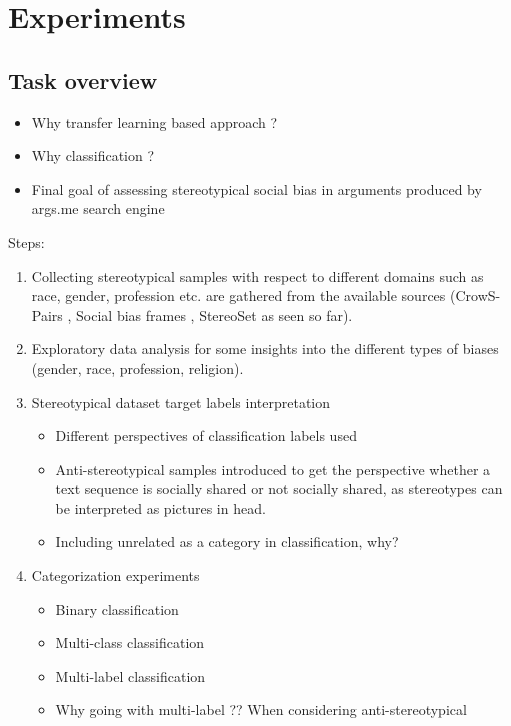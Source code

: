 \chapter{Experiments}

\section{ Task overview}
\begin{itemize}
    \item Why transfer learning based approach ?
    \item Why classification ?
    \item Final goal of assessing stereotypical social bias in arguments produced by args.me search engine
\end{itemize}

Steps: 
\begin{enumerate}
    \item Collecting stereotypical samples with respect to different domains such as race, gender, profession etc. are gathered from the available sources (CrowS-Pairs \cite{nangia2020crows}, Social bias frames \cite{sap2019social}, StereoSet \cite{nadeem2020stereoset} as seen so far).
    \item Exploratory data analysis for some insights into the different types of biases (gender, race, profession, religion).
    \item Stereotypical dataset target labels interpretation
        \begin{itemize}
            \item Different perspectives of classification labels used 
            \item Anti-stereotypical samples introduced to get the perspective whether a text sequence is socially shared or not socially shared, as stereotypes can be interpreted as pictures in head.
            \item  Including unrelated as a category in classification, why?
        \end{itemize}
    \item Categorization experiments
    \begin{itemize}
        \item Binary classification 
        \item Multi-class classification 
        \item Multi-label classification 
        \item Why going with multi-label ?? When considering anti-stereotypical 
    \end{itemize}
\end{enumerate}
